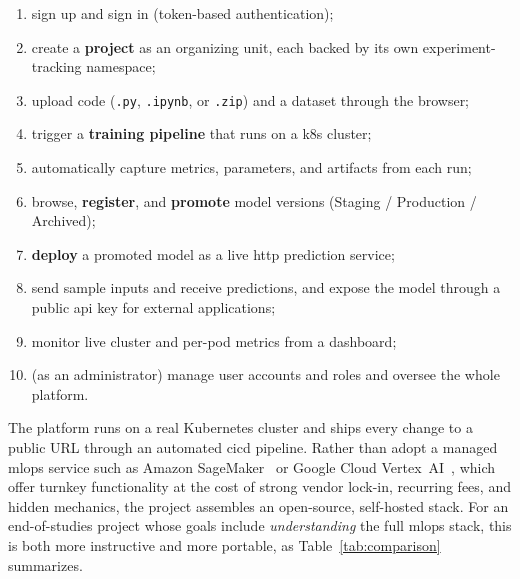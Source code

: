 \begin{enumerate}[leftmargin=1.6em]
  \item sign up and sign in (token-based authentication);
  \item create a \textbf{project} as an organizing unit, each backed by its own
        experiment-tracking namespace;
  \item upload code (\texttt{.py}, \texttt{.ipynb}, or \texttt{.zip}) and a
        dataset through the browser;
  \item trigger a \textbf{training pipeline} that runs on a \gls{k8s} cluster;
  \item automatically capture metrics, parameters, and artifacts from each run;
  \item browse, \textbf{register}, and \textbf{promote} model versions
        (Staging / Production / Archived);
  \item \textbf{deploy} a promoted model as a live \gls{http} prediction service;
  \item send sample inputs and receive predictions, and expose the model through a
        public \gls{api} key for external applications;
  \item monitor live cluster and per-pod metrics from a dashboard;
  \item (as an administrator) manage user accounts and roles and oversee the whole
        platform.
\end{enumerate}

The platform runs on a real Kubernetes cluster and ships every change to a public
URL through an automated \gls{cicd} pipeline. Rather than adopt a managed
\gls{mlops} service such as Amazon SageMaker~\cite{sagemaker} or Google Cloud
Vertex~AI~\cite{vertexai}, which offer turnkey functionality at the cost of strong
vendor lock-in, recurring fees, and hidden mechanics, the project assembles an
open-source, self-hosted stack. For an end-of-studies project whose goals include
\emph{understanding} the full \gls{mlops} stack, this is both more instructive and
more portable, as Table~\ref{tab:comparison} summarizes.

